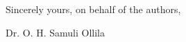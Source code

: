 \documentclass[11pt]{letter}
\begin{document}



Sincerely yours, on behalf of the authors,

Dr. O. H. Samuli Ollila
\end{document}

